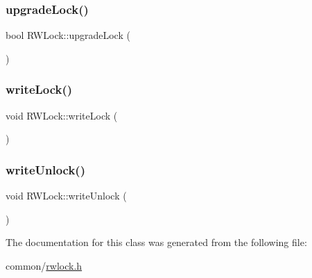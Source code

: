 \mbox{\label{classRWLock_a5ac47c287ea985c1ac0df8feac4eb089}} 
\subsubsection{\texorpdfstring{upgrade\+Lock()}{upgradeLock()}}
{\footnotesize\ttfamily bool R\+W\+Lock\+::upgrade\+Lock (\begin{DoxyParamCaption}{ }\end{DoxyParamCaption})\hspace{0.3cm}{\ttfamily [inline]}}

\mbox{\label{classRWLock_a64b83c3c0cff22d9d3512daaeacc7bfb}} 
\subsubsection{\texorpdfstring{write\+Lock()}{writeLock()}}
{\footnotesize\ttfamily void R\+W\+Lock\+::write\+Lock (\begin{DoxyParamCaption}{ }\end{DoxyParamCaption})\hspace{0.3cm}{\ttfamily [inline]}}

\mbox{\label{classRWLock_a3c735ecb40882e9c4c3b7f8419692bad}} 
\subsubsection{\texorpdfstring{write\+Unlock()}{writeUnlock()}}
{\footnotesize\ttfamily void R\+W\+Lock\+::write\+Unlock (\begin{DoxyParamCaption}{ }\end{DoxyParamCaption})\hspace{0.3cm}{\ttfamily [inline]}}



The documentation for this class was generated from the following file\+:\begin{DoxyCompactItemize}
\item 
common/\hyperlink{rwlock_8h}{rwlock.\+h}\end{DoxyCompactItemize}
